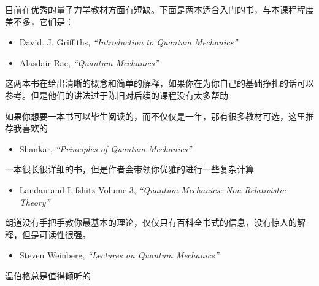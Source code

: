 目前在优秀的量子力学教材方面有短缺。下面是两本适合入门的书，与本课程程度差不多，它们是：
\begin{itemize}
    \item David. J. Griffiths, \textit{“Introduction to Quantum Mechanics”}
    \item Alasdair Rae, \textit{“Quantum Mechanics”}
\end{itemize}
\par
这两本书在给出清晰的概念和简单的解释，如果你在为你自己的基础挣扎的话可以参考。但是他们的讲法过于陈旧对后续的课程没有太多帮助
\par
如果你想要一本书可以毕生阅读的，而不仅仅是一年，那有很多教材可选，这里推荐我喜欢的
\begin{itemize}
    \item Shankar, \textit{“Principles of Quantum Mechanics”}
\end{itemize}
一本很长很详细的书，但是作者会带领你优雅的进行一些复杂计算
\begin{itemize}
    \item Landau and Lifshitz Volume 3, \textit{“Quantum Mechanics: Non-Relativistic Theory”}
\end{itemize}
朗道没有手把手教你最基本的理论，仅仅只有百科全书式的信息，没有惊人的解释，但是可读性很强。
\begin{itemize}
    \item Steven Weinberg, \textit{“Lectures on Quantum Mechanics”}
\end{itemize}
温伯格总是值得倾听的